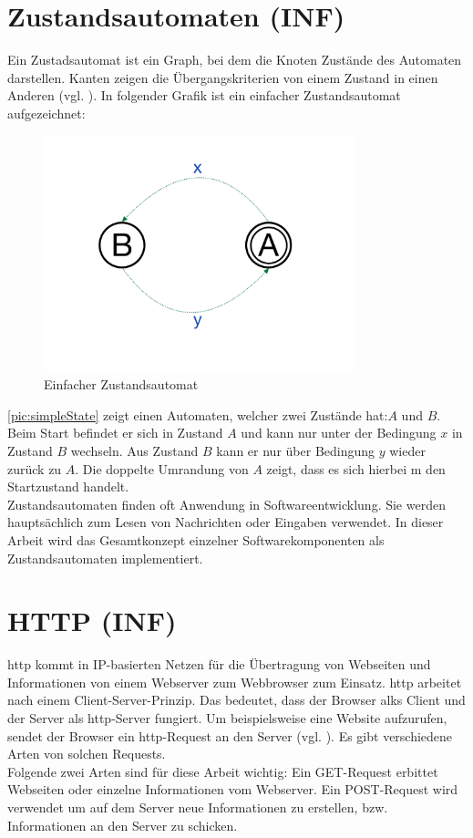 \section{Zustandsautomaten (INF)}
Ein Zustadsautomat ist ein Graph, bei dem die Knoten Zustände des Automaten darstellen. Kanten zeigen die Übergangskriterien von einem Zustand in einen Anderen (vgl. \cite{infoSkript}). In folgender Grafik ist ein einfacher Zustandsautomat aufgezeichnet: 

\begin{figure}[h]
	\begin{center}
		\includegraphics[width=9cm]{simpleState.pdf}
		\caption{\label{pic:simpleState}Einfacher Zustandsautomat}
	\end{center}
\end{figure}

\autoref{pic:simpleState} zeigt einen Automaten, welcher zwei Zustände hat:$A$ und $B$. Beim Start befindet er sich in Zustand $A$ und kann nur unter der Bedingung $x$ in Zustand $B$ wechseln. Aus Zustand $B$ kann er nur über Bedingung $y$ wieder zurück zu $A$. Die doppelte Umrandung von $A$ zeigt, dass es sich hierbei m den Startzustand handelt. \\
Zustandsautomaten finden oft Anwendung in Softwareentwicklung. Sie werden hauptsächlich zum Lesen von Nachrichten oder Eingaben verwendet. In dieser Arbeit wird das Gesamtkonzept einzelner Softwarekomponenten als Zustandsautomaten implementiert.

\section{HTTP (INF)}
\acrfull{http} kommt in IP-basierten Netzen für die Übertragung von Webseiten und Informationen von einem Webserver zum Webbrowser zum Einsatz. \acrshort{http} arbeitet nach einem Client-Server-Prinzip. Das bedeutet, dass der Browser alks Client und der Server als \acrshort{http}-Server fungiert. Um beispielsweise eine Website aufzurufen, sendet der Browser ein \acrshort{http}-Request an den Server (vgl. \cite{http}). Es gibt verschiedene Arten von solchen Requests. \\Folgende zwei Arten sind für diese Arbeit wichtig: Ein GET-Request erbittet Webseiten oder einzelne Informationen vom Webserver. Ein POST-Request wird verwendet um auf dem Server neue Informationen zu erstellen, bzw. Informationen an den Server zu schicken. 